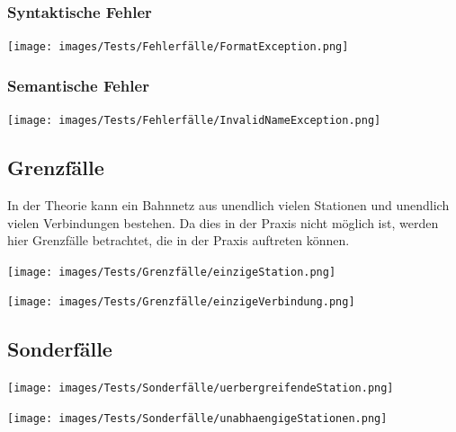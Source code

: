 \subsubsection{Syntaktische Fehler}\label{test:sec:syntaktische-fehler}
\begin{center}
    \texttt{[image: images/Tests/Fehlerfälle/FormatException.png]}
    \label{test:subsecpar:format-fehler}
\end{center}

\subsubsection{Semantische Fehler}\label{test:sec:semantische-fehler}
\begin{center}
    \texttt{[image: images/Tests/Fehlerfälle/InvalidNameException.png]}
    \label{test:subsecpar:namen-sind-nicht-erlaubt}
\end{center}

\subsection{Grenzfälle}\label{test:sec:grenzfaelle}
In der Theorie kann ein Bahnnetz aus unendlich vielen Stationen und unendlich vielen Verbindungen bestehen. Da dies in der Praxis nicht möglich ist, werden hier Grenzfälle betrachtet, die in der Praxis auftreten können.\\

\begin{center}
    \texttt{[image: images/Tests/Grenzfälle/einzigeStation.png]}
    \label{test:subsecpar:einzige-station}
\end{center}

\begin{center}
    \texttt{[image: images/Tests/Grenzfälle/einzigeVerbindung.png]}
    \label{test:subsecpar:einzige}
\end{center}


\subsection{Sonderfälle}\label{test:sec:sonderfaelle}

\begin{center}
    \texttt{[image: images/Tests/Sonderfälle/uerbergreifendeStation.png]}
    \label{test:subsecpar:uerbergreifendeStation}
\end{center}

\begin{center}
    \texttt{[image: images/Tests/Sonderfälle/unabhaengigeStationen.png]}
    \label{test:subsecpar:unabhaengigeStationen}
\end{center}


